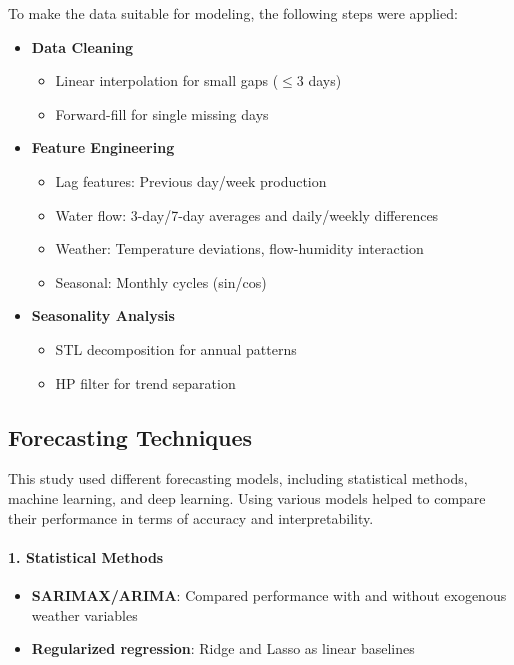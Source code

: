 \documentclass[12pt]{article}
\begin{document}
To make the data suitable for modeling, the following steps were applied:
\begin{itemize}
    \item \textbf{Data Cleaning}
    \begin{itemize}
        \item Linear interpolation for small gaps ($\leq$3 days)
        \item Forward-fill for single missing days
    \end{itemize}
    
    \item \textbf{Feature Engineering}
    \begin{itemize}
        \item Lag features: Previous day/week production
        \item Water flow: 3-day/7-day averages and daily/weekly differences
        \item Weather: Temperature deviations, flow-humidity interaction
        \item Seasonal: Monthly cycles (sin/cos)
    \end{itemize}
    
    \item \textbf{Seasonality Analysis}
    \begin{itemize}
        \item STL decomposition for annual patterns
        \item HP filter for trend separation
    \end{itemize}
\end{itemize}

\subsection{Forecasting Techniques}
\label{sec:models}
This study used different forecasting models, including statistical methods, machine learning, and deep learning. Using various models helped to compare their performance in terms of accuracy and interpretability.

\paragraph{1. Statistical Methods}
\begin{itemize}
    \item \textbf{SARIMAX/ARIMA}: Compared performance with and without exogenous weather variables
    \item \textbf{Regularized regression}: Ridge and Lasso as linear baselines
\end{itemize}
\end{document}
